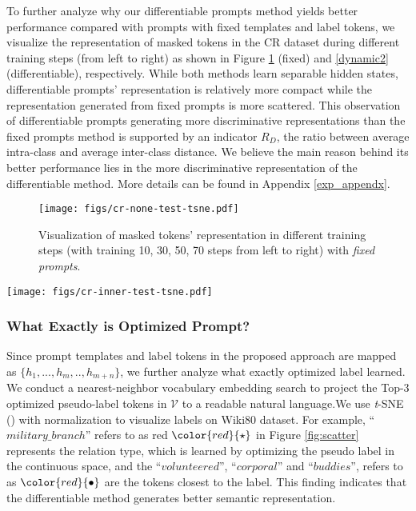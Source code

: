 \documentclass{article} \usepackage{iclr2022_conference,times}
\newcommand{\ti}[1]{\textit{#1}}
\newcommand{\vocabulary}{\mathcal{V}}
\begin{document}
To further analyze why our differentiable prompts method yields better performance compared with prompts with fixed templates and label tokens, we visualize the representation of masked tokens in the CR dataset during different training steps (from left to right) as shown in Figure \ref{dynamic1} (fixed) and \ref{dynamic2} (differentiable), respectively.
While both methods learn separable hidden states, differentiable prompts' representation is relatively more compact while the representation generated from fixed prompts is more scattered.
This observation of differentiable prompts generating more discriminative representations than the fixed prompts method is supported by an indicator $R_D$, the ratio between average intra-class and average inter-class distance. We believe the main reason behind its better performance lies in the more discriminative representation of the differentiable method. More details can be found in Appendix \ref{exp_appendx}.

\begin{figure}[!htbp]
 \centering
  \texttt{[image: figs/cr-none-test-tsne.pdf]}

\caption{
\color{highlight}
Visualization of masked tokens' representation in different training steps (with training 10, 30, 50, 70 steps from left to right) with \emph{fixed prompts}.
}
\label{dynamic1}
\end{figure}

\begin{figure*}[!htbp]
 \centering
  \texttt{[image: figs/cr-inner-test-tsne.pdf]}
\caption{
\color{highlight}
Visualization of masked tokens' representation in different training steps (with training 10, 30, 50, 70 steps from left to right) with \emph{differentiable prompts}.
}
\label{dynamic2}
\end{figure*}



\subsubsection*{What Exactly is Optimized Prompt?}



Since prompt templates and label tokens in the proposed approach are mapped as $\{h_{1},...,h_{m},..,h_{m+n}\}$, we further analyze what exactly optimized label learned. 
We conduct a nearest-neighbor vocabulary embedding search to project the Top-3 optimized pseudo-label tokens in  ${\vocabulary}$ to a readable natural language.We use \ti{t}-SNE (\cite{van2008visualizing}) with normalization to visualize labels on Wiki80 dataset. 
For example, ``$military\_branch$'' refers to as red  $\color{red}{\star}$ in Figure \ref{fig:scatter} represents the relation type, which is learned by optimizing the pseudo label in the continuous space, and the ``$volunteered$'', ``$corporal$'' and ``$buddies$'', refers to as $\color{red}{\bullet}$ are the tokens closest to the label.
This finding indicates that the differentiable method generates better semantic representation.
\end{document}
